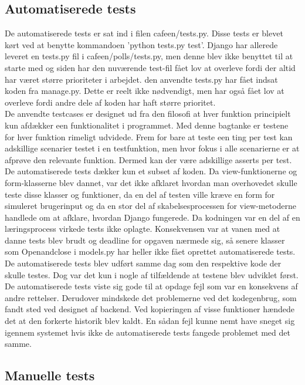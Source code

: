 \documentclass[]{article}
\begin{document}
\subsection{Automatiserede tests}

De automatiserede tests er sat ind i filen cafeen/tests.py. Disse tests er blevet kørt ved at benytte kommandoen 'python tests.py test'. Django har allerede leveret en tests.py fil i cafeen/polls/tests.py, men denne blev ikke benyttet til at starte med og siden har den nuværende test-fil fået lov at overleve fordi der altid har været større prioriteter i arbejdet. den anvendte tests.py har fået indsat koden fra manage.py. Dette er reelt ikke nødvendigt, men har også fået lov at overleve fordi andre dele af koden har haft større prioritet. \\
\indent De anvendte testcases er designet ud fra den filosofi at hver funktion principielt kun afdækker een funktionalitet i programmet. Med denne bagtanke er testene for hver funktion rimeligt udvidede. Frem for bare at teste een ting per test kan adskillige scenarier testet i en testfunktion, men hvor fokus i alle scenarierne er at afprøve den relevante funktion. Dermed kan der være adskillige asserts per test.
\indent De automatiserede tests dækker kun et subset af koden. Da view-funktionerne og form-klasserne blev dannet, var det ikke afklaret hvordan man overhovedet skulle teste disse klasser og funktioner, da en del af testen ville kræve en form for simuleret brugerinput og da en stor del af skabelsesprocessen for view-metoderne handlede om at afklare, hvordan Django fungerede. Da kodningen var en del af en læringsprocess virkede tests ikke oplagte. Konsekvensen var at vanen med at danne tests blev brudt og deadline for opgaven nærmede sig, så senere klasser som Openandclose i models.py har heller ikke fået oprettet automatiserede tests. \\
\indent De automatiserede tests blev udført samme dag som den respektive kode der skulle testes. Dog var det kun i nogle af tilfældende at testene blev udviklet først. De automatiserede tests viste sig gode til at opdage fejl som var en konsekvens af andre rettelser. Derudover mindskede det problemerne ved det kodegenbrug, som fandt sted ved designet af backend. Ved kopieringen af visse funktioner hændede det at den forkerte historik blev kaldt. En sådan fejl kunne nemt have sneget sig igennem systemet hvis ikke de automatiserede tests fangede problemet med det samme.

\subsection{Manuelle tests}
\end{document}
